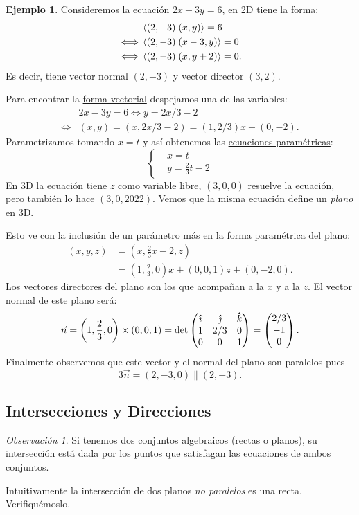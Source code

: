 \documentclass[12pt]{article}
\theoremstyle{plain}
\theoremstyle{definition}
\newtheorem{Ex}[Th]{Ejemplo}           %
\theoremstyle{remark}
\newtheorem*{Rmk}{Observación}      %
\newcommand{\x}{\times}             %
\renewcommand{\:}{\colon}           %
\newcommand{\un}[1]{\underline{#1}}
\renewcommand{\.}{\Cdot}                %
\newcommand{\threebyone}[3]{\begin{pmatrix} %
  #1 \\ #2 \\ #3 \end{pmatrix}}
\newcommand{\threebythree}[9]{\begin{pmatrix} %
  #1 & #2 & #3 \\ #4 & #5 & #6 \\ #7 & #8 & #9 \end{pmatrix}}
\newcommand{\thickhat}[1]{\mathbf{\hat{\text{$#1$}}}}
\newcommand{\ii}{\vu{\imath}}
\newcommand{\jj}{\vu{\jmath}}
\newcommand{\kk}{\thickhat{k}}
\begin{document}
\begin{multicols}{2}
\begin{Ex}
Consideremos la ecuación $2x-3y=6$, en 2D tiene la forma:
\begin{align*}
  &\braket{(2,-3)}{(x,y)}=6\\
  \iff&\braket{(2,-3)}{(x-3,y)}=0\\
  \iff&\braket{(2,-3)}{(x,y+2)}=0.
\end{align*}
Es decir, tiene vector normal $(2,-3)$ y vector director $(3,2)$.\par 
Para encontrar la \un{forma vectorial} despejamos una de las variables:
\begin{align*}
  &2x-3y=6\iff y=2x/3-2\\
  \iff&(x,y)=\left(x,2x/3-2\right)=\left(1,2/3\right)x+(0,-2).
\end{align*}
Parametrizamos tomando $x=t$ y así obtenemos las \un{ecuaciones paramétricas}:
$$
\left\lbrace
\begin{aligned}
  &x=t\\
  &y=\frac23t-2
\end{aligned}
\right.
$$
En 3D la ecuación tiene $z$ como variable libre, $(3,0,0)$ resuelve la ecuación, pero también lo hace $(3,0,2022)$. Vemos que la misma ecuación define un \emph{plano} en 3D.\par 
Esto ve con la inclusión de un parámetro más en la \un{forma paramétrica} del plano:
\begin{align*}
  (x,y,z)&=\left(x,\frac23x-2,z\right)\\
  &=\left(1,\frac23,0\right)x+(0,0,1)z+(0,-2,0).
\end{align*}
Los vectores directores del plano son los que acompañan a la $x$ y a la $z$. El vector normal de este plano será:
$$\vec{n}=\left(1,\frac23,0\right)\x(0,0,1)=\det\threebythree{\ii}{\jj}{\kk}{1}{2/3}{0}{0}{0}{1}=\threebyone{2/3}{-1}{0}.$$
Finalmente observemos que este vector y el normal del plano son paralelos pues 
$$3\vec{n}=(2,-3,0)\parallel(2,-3).$$
\end{Ex}
\subsection*{Intersecciones y Direcciones}

\begin{Rmk}
  Si tenemos dos conjuntos algebraicos (rectas o planos), su intersección está dada por los puntos que satisfagan las ecuaciones de ambos conjuntos.
\end{Rmk}

Intuitivamente la intersección de dos planos \emph{no paralelos} es una recta. Verifiquémoslo.


\end{multicols}
\end{document}
